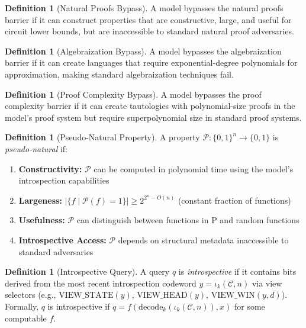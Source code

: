 \documentclass[11pt]{article}
\theoremstyle{definition}
\newtheorem{definition}[theorem]{Definition}
\begin{document}
\begin{definition}[Natural Proofs Bypass]
A model bypasses the natural proofs barrier if it can construct properties that are constructive, large, and useful for circuit lower bounds, but are inaccessible to standard natural proof adversaries.
\end{definition}

\begin{definition}[Algebraization Bypass]
A model bypasses the algebraization barrier if it can create languages that require exponential-degree polynomials for approximation, making standard algebraization techniques fail.
\end{definition}

\begin{definition}[Proof Complexity Bypass]
A model bypasses the proof complexity barrier if it can create tautologies with polynomial-size proofs in the model's proof system but require superpolynomial size in standard proof systems.
\end{definition}

\begin{definition}[Pseudo-Natural Property]
A property $\mathcal{P}: \{0,1\}^n \to \{0,1\}$ is \textit{pseudo-natural} if:
\begin{enumerate}
\item \textbf{Constructivity:} $\mathcal{P}$ can be computed in polynomial time using the model's introspection capabilities
\item \textbf{Largeness:} $|\{f \mid \mathcal{P}(f) = 1\}| \geq 2^{2^n - O(n)}$ (constant fraction of functions)
\item \textbf{Usefulness:} $\mathcal{P}$ can distinguish between functions in $\text{P}$ and random functions
\item \textbf{Introspective Access:} $\mathcal{P}$ depends on structural metadata inaccessible to standard adversaries
\end{enumerate}
\end{definition}

\begin{definition}[Introspective Query]
A query $q$ is \textit{introspective} if it contains bits derived from the most recent introspection codeword $y=\iota_k(\mathcal{C},n)$ via view selectors (e.g., $\mathrm{VIEW\_STATE}(y)$, $\mathrm{VIEW\_HEAD}(y)$, $\mathrm{VIEW\_WIN}(y,d)$). Formally, $q$ is introspective if $q = f(\mathrm{decode}_k(\iota_k(\mathcal{C}, n)), x)$ for some computable $f$.
\end{definition}
\end{document}
